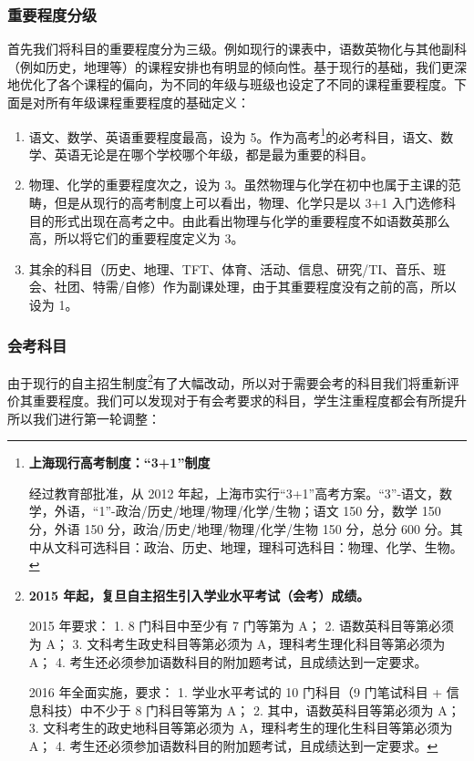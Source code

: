 \documentclass[a4paper]{article}
\begin{document}
  \subsubsection{重要程度分级}

   首先我们将科目的重要程度分为三级。例如现行的课表中，语数英物化与其他副科（例如历史，地理等）的课程安排也有明显的倾向性。基于现行的基础，我们更深地优化了各个课程的偏向，为不同的年级与班级也设定了不同的课程重要程度。下面是对所有年级课程重要程度的基础定义：

   \begin{enumerate}

   \item 语文、数学、英语重要程度最高，设为 5。作为高考\footnote{
   \hypertarget{gaokao}{\textbf{上海现行高考制度：“3+1”制度}}

   经过教育部批准，从 2012 年起，上海市实行“3+1”高考方案。“3”-语文，数学，外语，“1”-政治/历史/地理/物理/化学/生物；语文 150 分，数学 150 分，外语 150 分，政治/历史/地理/物理/化学/生物 150 分，总分 600 分。其中从文科可选科目：政治、历史、地理，理科可选科目：物理、化学、生物。
   }的必考科目，语文、数学、英语无论是在哪个学校哪个年级，都是最为重要的科目。

   \item 物理、化学的重要程度次之，设为 3。虽然物理与化学在初中也属于主课的范畴，但是从现行的高考制度\hyperlink{gaokao}{\footnotemark[1]}上可以看出，物理、化学只是以 3+1 入门选修科目的形式出现在高考之中。由此看出物理与化学的重要程度不如语数英那么高，所以将它们的重要程度定义为 3。

   \item 其余的科目（历史、地理、TFT、体育、活动、信息、研究/TI、音乐、班会、社团、特需/自修）作为副课处理，由于其重要程度没有之前的高，所以设为 1。

   \end{enumerate}

  \subsubsection{会考科目}

   由于现行的自主招生制度\footnote{
   \textbf{2015 年起，复旦自主招生引入学业水平考试（会考）成绩。}

   2015 年要求：
   1. 8 门科目中至少有 7 门等第为 A；
   2. 语数英科目等第必须为 A；
   3. 文科考生政史科目等第必须为 A，理科考生理化科目等第必须为 A；
   4. 考生还必须参加语数科目的附加题考试，且成绩达到一定要求。

   2016 年全面实施，要求：
   1. 学业水平考试的 10 门科目（9 门笔试科目 + 信息科技）中不少于 8 门科目等第为 A；
   2. 其中，语数英科目等第必须为 A；
   3. 文科考生的政史地科目等第必须为 A，理科考生的理化生科目等第必须为 A；
   4. 考生还必须参加语数科目的附加题考试，且成绩达到一定要求。
   }有了大幅改动，所以对于需要会考的科目我们将重新评价其重要程度。我们可以发现对于有会考要求的科目，学生注重程度都会有所提升所以我们进行第一轮调整：
\end{document}
